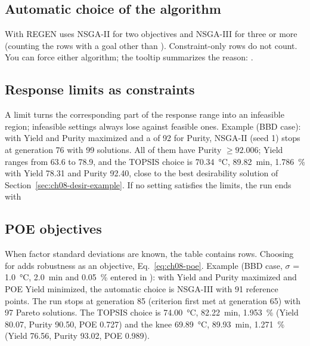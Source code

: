 \subsection{Automatic choice of the algorithm}
\label{sec:ch08-auto}
With  REGEN uses NSGA-II for two objectives and NSGA-III for three
or more (counting the rows with a goal other than ). Constraint-only rows do not count. You can force
either algorithm; the tooltip summarizes the reason: .

\subsection{Response limits as constraints}
A limit turns the corresponding part of the response range into an infeasible region; infeasible settings always
lose against feasible ones. Example (BBD case): with Yield and Purity maximized and a 
of 92 for Purity, NSGA-II (seed 1) stops at generation 76 with 99 solutions. All of them have Purity
$\ge92.006$; Yield ranges from 63.6 to 78.9, and the TOPSIS choice is 70.34~°C, 89.82~min, 1.786~\% with Yield
78.31 and Purity 92.40, close to the best desirability solution of Section~\ref{sec:ch08-desir-example}. If no
setting satisfies the limits, the run ends with 

\subsection{POE objectives}
When factor standard deviations are known, the table contains  rows. Choosing  for
 adds robustness as an objective, Eq.~\eqref{eq:ch08-poe}. Example (BBD case, $\sigma$ = 1.0~°C,
2.0~min and 0.05~\% entered in ): with Yield and Purity maximized and POE Yield
minimized, the automatic choice is NSGA-III with 91 reference points. The run stops at generation 85 (criterion
first met at generation 65) with 97 Pareto solutions. The TOPSIS choice is 74.00~°C, 82.22~min, 1.953~\%
(Yield 80.07, Purity 90.50, POE 0.727) and the knee 69.89~°C, 89.93~min, 1.271~\% (Yield 76.56, Purity 93.02,
POE 0.989).

